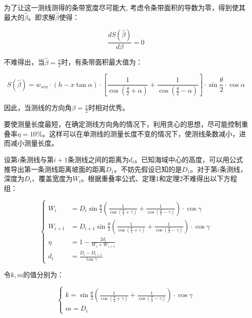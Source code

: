 为了让这一测线测得的条带宽度尽可能大, 考虑令条带面积的导数为零，得到使其最大的$\hat \beta$。即求解$\hat \beta$使得：

\begin{equation}
    \frac{dS(\hat \beta)}{d\beta} = 0
\end{equation}

不难得出，当$\hat \beta = \frac{\pi}{2}$时，有条带面积最大值为：

\begin{equation}
    S(\hat \beta) =
    w_{sea} \cdot (h - x\tan \alpha) \cdot \left[
        \frac{1}{\cos \left(
            \frac{\theta}{2} + \alpha
            \right)} + \frac{1}{\cos \left(
            \frac{\theta}{2} - \alpha
            \right)}
        \right]\cdot \sin \frac{\theta}{2} \cdot \cos \alpha
\end{equation}

因此，当测线的方向角$\beta = \frac{\pi}{2}$时相对优秀。


要使测量长度最短，在确定测线方向角的情况下，利用贪心的思想，尽可能控制重叠率$\eta = 10\%$。这样可以在单测线的测量长度不变的情况下，使测线条数减小，进而减小测量长度。

设第$i$条测线与第$i + 1$条测线之间的距离为$d_i$。已知海域中心的高度，可以用公式推导出第一条测线距离坡面的距离$D_1$。不妨先假设已知的是$D_1$。对于第$i$条测线，深度为$D_i$、覆盖宽度为$W_i$。根据重叠率公式、定理1和定理2不难得出以下方程组：

\begin{equation}
    \begin{cases}
        W_i       & = D_i\sin\frac{\theta}{2}\left(\frac{1}{\cos(\frac{\theta}{2}+\gamma)} + \frac{1}{\cos(\frac{\theta}{2}-\gamma)}\right) \cdot \cos \gamma       \\
        W_{i + 1} & = D_{i + 1}\sin\frac{\theta}{2}\left(\frac{1}{\cos(\frac{\theta}{2}+\gamma)} + \frac{1}{\cos(\frac{\theta}{2}-\gamma)}\right) \cdot \cos \gamma \\
        \eta      & = 1 - \frac{2d_i}{W_i + W_{i + 1}}                                                                                                              \\
        d_i       & = \frac{D_i - D_{i + 1}}{\tan \gamma}
    \end{cases}
\end{equation}

令$k, m$的值分别为：

\begin{equation}
    \begin{cases}
        k =
        \sin\frac{\theta}{2}\left(
        \frac{1}{\cos(\frac{\theta}{2}+\gamma)} +
        \frac{1}{\cos(\frac{\theta}{2}-\gamma)}
        \right) \cdot \cos \gamma \\
        m = D_i
    \end{cases}
\end{equation}

